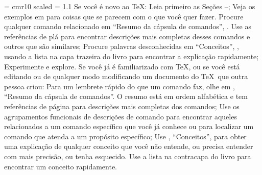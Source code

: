


{\font\rm = cmr10 scaled \magstephalf \baselineskip = 1.1\baselineskip
Se voc\^e \'e novo ao \TeX:
\ulist
\li Leia primeiro as Se\c c\~oes 
--;
\li Veja os exemplos em  para coisas que se parecem 
com o que voc\^e quer fazer.  Procure qualquer comando relacionado em 
``Resumo da c\'apsula de comandos'', .  Use as 
refer\^encias de p l\'a para encontrar descri\c c\~oes mais 
completas desses comandos e outros que s\~ao similares;
\li Procure palavras desconhecidas em ``Conceitos'', 
, usando a lista na capa trazeira do livro para 
encontrar a explica\c c\~ao rapidamente;
\li Experimente e explore.
\endulist
\bigskip
\noindent
Se voc\^e j\'a \'e familiarizado com \TeX, ou se voc\^e est\'a editando 
ou de qualquer modo modificando um documento do \TeX\ que outra pessoa 
criou:
\ulist
\li Para um lembrete r\'apido do que um comando faz, olhe em 
, ``Resumo da c\'apsula de comandos''.  O resumo 
est\'a em ordem alfab\'etica e tem refer\^encias de p\'agina para 
descri\c c\~oes mais completas dos comandos;
\li Use os agrupamentos funcionais de descri\c c\~oes de comando para 
encontrar aqueles relacionados a um comando espec\'ifico que voc\^e j\'a 
conhece ou para localizar um comando que atenda a um prop\'osito 
espec\'ifico;
\li Use , ``Conceitos'', para obter uma 
explica\c c\~ao de qualquer conceito que voc\^e n\~ao entende, ou 
precisa entender com mais precis\~ao, ou tenha esquecido.  Use a lista 
na contracapa do livro para encontrar um conceito rapidamente.
\endulist
}
\pagebreak

\byebye
